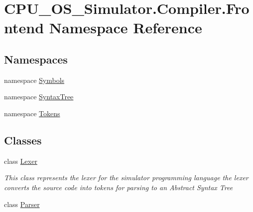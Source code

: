 \hypertarget{namespace_c_p_u___o_s___simulator_1_1_compiler_1_1_frontend}{}\section{C\+P\+U\+\_\+\+O\+S\+\_\+\+Simulator.\+Compiler.\+Frontend Namespace Reference}
\label{namespace_c_p_u___o_s___simulator_1_1_compiler_1_1_frontend}
\subsection*{Namespaces}
\begin{DoxyCompactItemize}
\item 
namespace \hyperlink{namespace_c_p_u___o_s___simulator_1_1_compiler_1_1_frontend_1_1_symbols}{Symbols}
\item 
namespace \hyperlink{namespace_c_p_u___o_s___simulator_1_1_compiler_1_1_frontend_1_1_syntax_tree}{Syntax\+Tree}
\item 
namespace \hyperlink{namespace_c_p_u___o_s___simulator_1_1_compiler_1_1_frontend_1_1_tokens}{Tokens}
\end{DoxyCompactItemize}
\subsection*{Classes}
\begin{DoxyCompactItemize}
\item 
class \hyperlink{class_c_p_u___o_s___simulator_1_1_compiler_1_1_frontend_1_1_lexer}{Lexer}
\begin{DoxyCompactList}\small\item\em This class represents the lexer for the simulator programming language the lexer converts the source code into tokens for parsing to an Abstract Syntax Tree \end{DoxyCompactList}\item 
class \hyperlink{class_c_p_u___o_s___simulator_1_1_compiler_1_1_frontend_1_1_parser}{Parser}
\end{DoxyCompactItemize}
